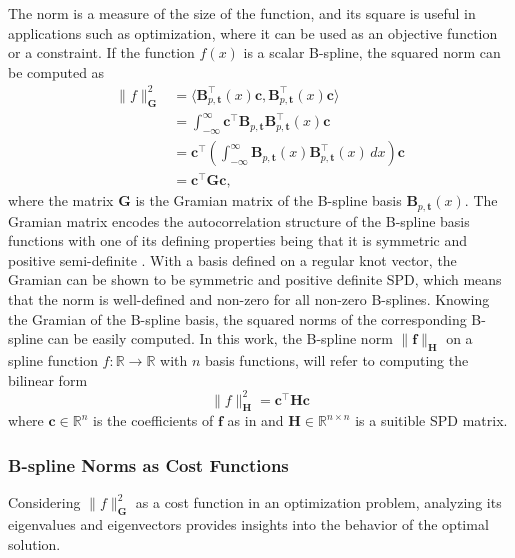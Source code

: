 The norm is a measure of the size of the function, and its square is useful in applications such as optimization, where it can be used as an objective function or a constraint. If the function $f(x)$ is a scalar B-spline, the squared norm can be computed as
\begin{equation}
    \label{eq:norm-spline}
    \begin{aligned}
        \|f\|_\mathbf G^2 &= \langle\mathbf B_{p, \mathbf t}^\top(x) \mathbf c, \mathbf B_{p, \mathbf t}^\top(x) \mathbf c\rangle \\
        &= \int_{-\infty}^\infty \mathbf c^\top \mathbf B_{p, \mathbf t}\mathbf B_{p, \mathbf t}^\top(x) \mathbf c \\
        &= \mathbf c^\top \left(\int_{-\infty}^\infty \mathbf B_{p, \mathbf t}(x) \mathbf B_{p, \mathbf t}^\top(x) \, dx\right) \mathbf c \\
        &= \mathbf c^\top \mathbf G \mathbf c,
\end{aligned}
\end{equation}
where the matrix $\mathbf G$ is the Gramian matrix of the B-spline basis $\mathbf B_{p, \mathbf t}(x)$. The Gramian matrix encodes the autocorrelation  structure of the B-spline basis functions with one of its defining properties being that it is symmetric and positive semi-definite \citep{horn2013positive}. With a basis defined on a regular knot vector, the Gramian can be shown to be symmetric and positive definite \acrshort{SPD}, which means that the norm is well-defined and non-zero for all non-zero B-splines.  Knowing the Gramian of the B-spline basis, the squared norms of the corresponding B-spline can be easily computed. In this work, the B-spline norm $\|\mathbf f\|_\mathbf H$ on a spline function $f: \mathbb R\to\mathbb R$ with $n$ basis functions, will refer to computing the bilinear form
\begin{equation}\label{eq:b-spline-norm}
    \|f\|_\mathbf H^2 = \mathbf{c}^\top \mathbf H \mathbf {c}
\end{equation}
where $\mathbf{c}\in\mathbb R^{n}$ is the coefficients of $\mathbf f$ as in and $\mathbf H\in\mathbb R^{n\times n}$ is a suitible SPD matrix. 


\subsubsection{B-spline Norms as Cost Functions}\label{sec:b-spline-norms-as-cost-functions}
Considering $\|f\|_\mathbf G^2$ as a cost function in an optimization problem, analyzing its eigenvalues and eigenvectors provides insights into the behavior of the optimal solution.


